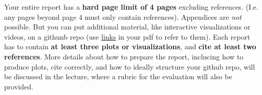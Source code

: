 \documentclass{article}
\theoremstyle{plain}
\theoremstyle{definition}
\theoremstyle{remark}
\begin{document}
Your entire report has a \textbf{hard page limit of 4 pages} excluding references. (I.e. any pages beyond page 4 must only contain references). Appendices are \emph{not} possible. But you can put additional material, like interactive visualizations or videos, on a githunb repo (use \href{https://github.com/pnkraemer/tueplots}{links} in your pdf to refer to them). Each report has to contain \textbf{at least three plots or visualizations}, and \textbf{cite at least two references}. More details about how to prepare the report, inclucing how to produce plots, cite correctly, and how to ideally structure your github repo, will be discussed in the lecture, where a rubric for the evaluation will also be provided.




\end{document}
